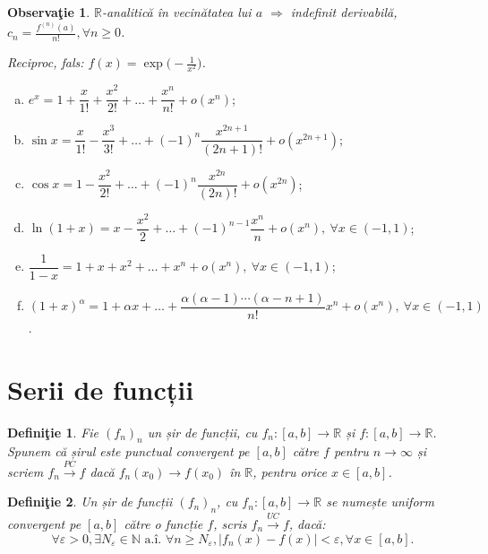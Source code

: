 \documentclass[11pt,a4paper]{article}
\newcommand\xrar{\xrightarrow}
\newcommand\ai{\text{ a.\^{i}. }}
\newcommand\NN{\mathbb{N}}
\newcommand\RR{\mathbb{R}}
\theoremstyle{dotless}
\theoremstyle{dotlessdr}
\newtheorem{definition}{Defini\c{t}ie}[section]
\newtheorem{remark}{Observa\c{t}ie}[section]
\begin{document}
\begin{remark}\label{rk:analitica-derivabila}
  $\RR$-analitică în vecinătatea lui $a$ $\Rightarrow$ indefinit derivabilă,
  $c_n = \frac{f^{(n)}(a)}{n!}, \forall n \geq 0$.

  Reciproc, fals: $f(x) = \exp \Big( - \frac{1}{x^2} \Big)$.
\end{remark}


\begin{enumerate}[(a)]
  \item $e^x = 1 + \dfrac{x}{1!} + \dfrac{x^2}{2!} + \dots + \dfrac{x^n}{n!} + o(x^n)$;
  \item $\sin x = \dfrac{x}{1!} - \dfrac{x^3}{3!} + \dots + (-1)^n \dfrac{x^{2n + 1}}{(2n + 1)!} + o(x^{2n + 1})$;
  \item $\cos x = 1 - \dfrac{x^2}{2!} + \dots + (-1)^n \dfrac{x^{2n}}{(2n)!} + o(x^{2n})$;
  \item $\ln (1 + x) = x - \dfrac{x^2}{2} + \dots + (-1)^{n - 1} \dfrac{x^n}{n} + o(x^n), \ \forall x \in (-1, 1)$;
  \item $\dfrac{1}{1 - x} = 1 + x + x^2 + \dots + x^n + o(x^n), \ \forall x \in (-1, 1)$;
  \item $(1 + x)^\alpha = 1 + \alpha x + \dots + \dfrac{\alpha(\alpha - 1) \cdots (\alpha - n + 1)}{n!} x^n + o(x^n), \ \forall x \in (-1, 1)$.
\end{enumerate}

\section{Serii de funcții}
\label{ch:serii-functii}

\begin{definition}\label{def:pc}
  Fie $(f_n)_n$ un șir de funcții, cu $f_n : [a, b] \to \RR$ și $f: [a, b] \to \RR$.
  Spunem că șirul este \emph{punctual convergent pe $[a, b]$ către $f$} pentru
  $n \to \infty$ și scriem $f_n \xrar{PC} f$ dacă $f_n(x_0) \to f(x_0)$ în $\RR$,
  pentru orice $x \in [a, b]$.
\end{definition}

\begin{definition}\label{def:uc}
  Un șir de funcții $(f_n)_n$, cu $f_n : [a, b] \to \RR$ se numește \emph{uniform %
    convergent pe $[a, b]$ către o funcție $f$}, scris $f_n \xrightarrow{UC} f$,
  dacă:
  \[
    \forall \varepsilon > 0, \exists N_\varepsilon \in \NN \ai \forall n \geq N_\varepsilon,
    |f_n(x) - f(x)| < \varepsilon, \forall x \in [a, b].
  \]
\end{definition}
\end{document}
